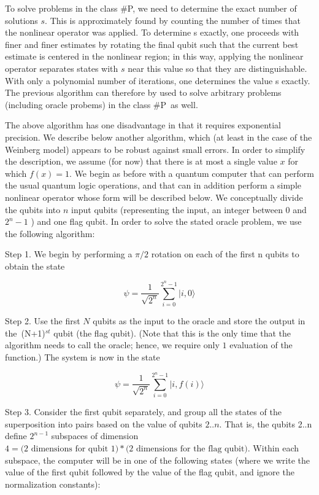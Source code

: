 \documentclass[12pt]{article}
\begin{document}
To solve problems in the class \#P, we need to determine the exact number of
solutions $s$. This is approximately found by counting the number of times that
the nonlinear operator was applied. To determine s exactly, one proceeds with
finer and finer estimates by rotating the final qubit such that the current
best estimate is centered in the nonlinear region; in this way, applying the
nonlinear operator separates states with $s$ near this value so that they are
distinguishable. With only a polynomial number of iterations, one determines
the value s exactly. The previous algorithm can therefore by used to solve
arbitrary problems (including oracle probems) in the class \#P\ as well.

The above algorithm has one disadvantage in that it requires exponential
precision.  We describe below another algorithm, which (at least in the case
of the Weinberg model) appears to be robust against small errors. In order to
simplify the description, we assume (for now) that there is at most a single
value $x$ for which $f(x) = 1$. We begin as before with a quantum computer that
can perform the usual quantum logic operations, and that can in addition
perform a simple nonlinear operator whose form will be described below. We
conceptually divide the qubits into $n$ input qubits (representing the input,
an integer between $0$ and $2^{n}-1$ ) and one flag qubit. In order to solve the
stated oracle problem, we use the following algorithm:

Step 1. We begin by performing a $\pi/2$ rotation on each of the first n
qubits to obtain the state%

\begin{equation}
\psi=\frac{1}{\sqrt{2^{n}}}\sum\limits_{i=0}^{2^{n}-1}|i,0\rangle
\end{equation}

Step 2. Use the first $N$ qubits as the input to the oracle and store the output
in the\ (N+1)$^{st}$ qubit (the flag qubit). (Note that this is the only time
that the algorithm needs to call the oracle; hence, we require only $1$
evaluation of the function.) The system is now in the state%

\begin{equation}
\psi=\frac{1}{\sqrt{2^{n}}}\sum\limits_{i=0}^{2^{n}-1}|i,f(i)\rangle
\end{equation}

Step 3. Consider the first qubit separately, and group all the states of the
superposition into pairs based on the value of qubits $2..n$. That is, the
qubits 2..n define $2^{n-1}$ subspaces of dimension $4 = \text{(2 dimensions for
qubit 1)} * \text{(2 dimensions for the flag qubit)}$. Within each subspace, the
computer will be in one of the following states (where we write the value of
the first qubit followed by the value of the flag qubit, and ignore the
normalization constants):%
\end{document}
